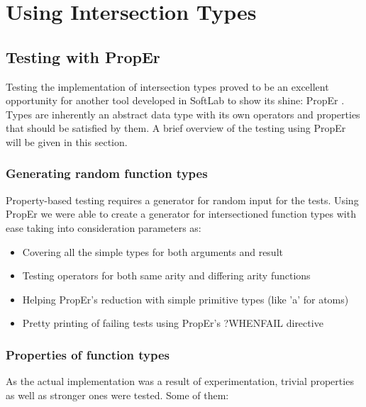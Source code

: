 \chapter{Using Intersection Types}
\label{chp:intersection_usage}

\section{Testing with PropEr}

Testing the implementation of intersection types proved to be an
excellent opportunity for another tool developed in SoftLab to show
its shine: PropEr \cite{Manolis}. Types are inherently an abstract
data type with its own operators and properties that should be
satisfied by them. A brief overview of the testing using PropEr will
be given in this section.

\subsection{Generating random function types}

Property-based testing requires a generator for random input for the
tests. Using PropEr we were able to create a generator for
intersectioned function types with ease taking into consideration
parameters as:
\begin{itemize}
\item Covering all the simple types for both arguments and result
\item Testing operators for both same arity and differing arity functions
\item Helping PropEr's reduction with simple primitive types (like 'a'
  for atoms)
\item Pretty printing of failing tests using PropEr's ?WHENFAIL directive
\end{itemize}

\subsection{Properties of function types}

As the actual implementation was a result of experimentation, trivial
properties as well as stronger ones were tested. Some of them:

